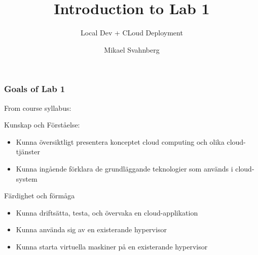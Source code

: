 \documentclass[10pt]{beamer}
\title[]{Introduction to Lab 1}
\subtitle{Local Dev + CLoud Deployment}
\author[Mikael Svahnberg]{Mikael Svahnberg\inst{1}}
\institute[BTH] %
{
  \inst{1}%
 Mikael.Svahnberg@bth.se\\
 School of Computing\\
 Blekinge Institute of Technology%
}
\begin{document}
\begin{frame}
  \titlepage
\end{frame}



\begin{frame}[t]
\frametitle{Goals of Lab 1}

From course syllabus:

Kunskap och Förståelse:
\begin{itemize}
\item Kunna översiktligt presentera konceptet cloud computing och olika cloud-tjänster
\item Kunna ingående förklara de grundläggande teknologier som används i cloud-system
\end{itemize}

Färdighet och förmåga
\begin{itemize}
\item Kunna driftsätta, testa, och övervaka en cloud-applikation
\item Kunna använda sig av en existerande hypervisor
\item Kunna starta virtuella maskiner på en existerande hypervisor
\end{itemize}

\end{frame}
\end{document}
